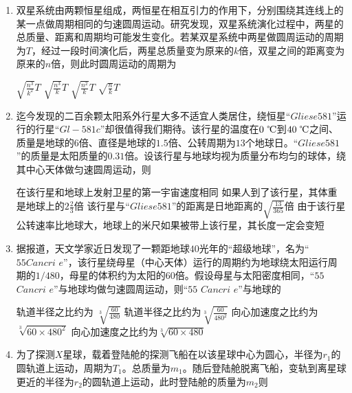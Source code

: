 \begin{enumerate}[leftmargin=0em]
\item 
{}
双星系统由两颗恒星组成，两恒星在相互引力的作用下，分别围绕其连线上的某一点做周期相同的匀速圆周运动。研究发现，双星系统演化过程中，两星的总质量、距离和周期均可能发生变化。若某双星系统中两星做圆周运动的周期为$ T $，经过一段时间演化后，两星总质量变为原来的$ k $倍，双星之间的距离变为原来的$ n $倍，则此时圆周运动的周期为  



\fourchoices
{$ \sqrt { \frac { n ^ { 3 } } { k ^ { 2 } } } T $}
{$ \sqrt { \frac { n ^ { 3 } } { k } } T $}
{$ \sqrt { \frac { n ^ { 2 } } { k } } T $}
{$ \sqrt { \frac { n } { k } } T $}




\item
{}
迄今发现的二百余颗太阳系外行星大多不适宜人类居住，绕恒星“$ Gliese581 $”运行的行星“$ Gl-581c $”却很值得我们期待。该行星的温度在$ 0 \ \celsius $到$ 40 \ \celsius $之间、质量是地球的$ 6 $倍、直径是地球的$ 1.5 $倍、公转周期为$ 13 $个地球日。“$ Gliese581 $”的质量是太阳质量的$ 0.31 $倍。设该行星与地球均视为质量分布均匀的球体，绕其中心天体做匀速圆周运动，则  

\fourchoices
{在该行星和地球上发射卫星的第一宇宙速度相同}
{如果人到了该行星，其体重是地球上的$ 2 \frac{ 2 }{ 3 } $倍}
{该行星与“$ Gliese581 $”的距离是日地距离的$\sqrt { \frac { 13 } { 365 } }$倍}
{由于该行星公转速率比地球大，地球上的米尺如果被带上该行星，其长度一定会变短}






\item 
{}
据报道，天文学家近日发现了一颗距地球$ 40 $光年的“超级地球”，名为“$ 55Cancri $ $ e $”，该行星绕母星（中心天体）运行的周期约为地球绕太阳运行周期的$ 1/480 $，母星的体积约为太阳的$ 60 $倍。假设母星与太阳密度相同，“$ 55 $ $ Cancri $ $ e $”与地球均做匀速圆周运动，则“$ 55 $ $ Cancri $ $ e $”与地球的  

\fourchoices
{轨道半径之比约为 $\sqrt [ 3 ] { \frac { 60 } { 480 } }$ 	 }
{轨道半径之比约为$\sqrt [ 3 ] { \frac { 60 } { 480 ^ { 2 } } }$}
{向心加速度之比约为$\sqrt [ 3 ] { 60 \times 480 ^ { 2 } }$ }
{向心加速度之比约为$\sqrt [ 3 ] { 60 \times 480 }$}



\item
{}
为了探测$ X $星球，载着登陆舱的探测飞船在以该星球中心为圆心，半径为$ r_{1} $的圆轨道上运动，周期为$ T_{1} $。总质量为$ m_{1} $。随后登陆舱脱离飞船，变轨到离星球更近的半径为$ r_{2} $的圆轨道上运动，此时登陆舱的质量为$ m_{2} $则  


\end{enumerate}
